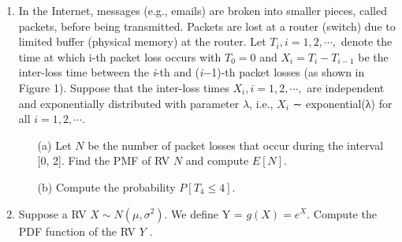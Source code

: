 \documentclass{report}
\begin{document}
\begin{enumerate}
\begin{itemize}
\end{itemize}
\item  In the Internet, messages (e.g., emails) are broken into smaller pieces, called packets, before being
transmitted. Packets are lost at a router (switch) due to limited buffer (physical memory) at the router.
Let $T_i, i = 1, 2, \cdots,$ denote the time at which i-th packet loss occurs with $T_0 = 0$ and $X_i = T_i − T_{i−1}$
be the inter-loss time between the \textit{i}-th and (\textit{i}−1)-th packet losses (as shown in Figure 1). Suppose that
the inter-loss times $X_i, i = 1, 2, \cdots ,$ are independent and exponentially distributed with parameter $λ$,
i.e., $X_i$ ∼ exponential(λ) for all $i = 1, 2, \cdots$.
\begin{itemize}
\item[(a)] Let $N$ be the number of packet losses that occur during the interval [0, 2]. Find the PMF of RV
$N$ and compute $E[N]$.
\item[(b)] Compute the probability $P[T_4 \leq 4]$.
\end{itemize}
\item  Suppose a RV $X ∼ N(\mu, \sigma^2)$. We define Y = $g(X) = e^X$. Compute the PDF function of the RV $Y$ .

\end{enumerate}
 
\end{document}
